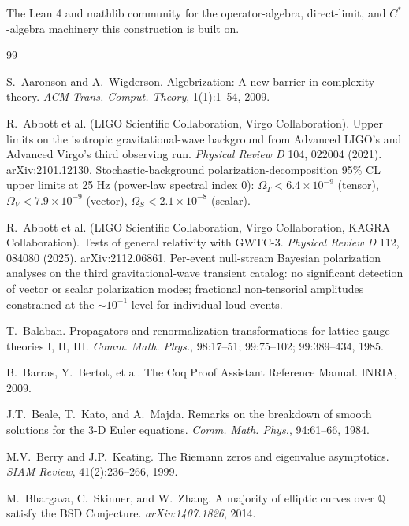 \documentclass[11pt,a4paper]{amsart}
\theoremstyle{plain}
\theoremstyle{definition}
\begin{document}
The Lean 4 and mathlib community for the operator-algebra, direct-limit, and $C^*$-algebra machinery this construction is built on.

\begin{thebibliography}{99}

S.~Aaronson and A.~Wigderson.
\newblock Algebrization: A new barrier in complexity theory.
\newblock \emph{ACM Trans. Comput. Theory}, 1(1):1--54, 2009.

R.~Abbott et al. (LIGO Scientific Collaboration, Virgo Collaboration).
\newblock Upper limits on the isotropic gravitational-wave background from Advanced LIGO's and Advanced Virgo's third observing run.
\newblock \emph{Physical Review D} 104, 022004 (2021). arXiv:2101.12130. Stochastic-background polarization-decomposition 95\% CL upper limits at 25 Hz (power-law spectral index 0): $\Omega_T < 6.4 \times 10^{-9}$ (tensor), $\Omega_V < 7.9 \times 10^{-9}$ (vector), $\Omega_S < 2.1 \times 10^{-8}$ (scalar).

R.~Abbott et al. (LIGO Scientific Collaboration, Virgo Collaboration, KAGRA Collaboration).
\newblock Tests of general relativity with GWTC-3.
\newblock \emph{Physical Review D} 112, 084080 (2025). arXiv:2112.06861. Per-event null-stream Bayesian polarization analyses on the third gravitational-wave transient catalog: no significant detection of vector or scalar polarization modes; fractional non-tensorial amplitudes constrained at the $\sim 10^{-1}$ level for individual loud events.

T.~Balaban.
\newblock Propagators and renormalization transformations for lattice gauge theories I, II, III.
\newblock \emph{Comm. Math. Phys.}, 98:17--51; 99:75--102; 99:389--434, 1985.

B.~Barras, Y.~Bertot, et al.
\newblock The Coq Proof Assistant Reference Manual.
\newblock INRIA, 2009.

J.T.~Beale, T.~Kato, and A.~Majda.
\newblock Remarks on the breakdown of smooth solutions for the 3-D Euler equations.
\newblock \emph{Comm. Math. Phys.}, 94:61--66, 1984.

M.V.~Berry and J.P.~Keating.
\newblock The Riemann zeros and eigenvalue asymptotics.
\newblock \emph{SIAM Review}, 41(2):236--266, 1999.

M.~Bhargava, C.~Skinner, and W.~Zhang.
\newblock A majority of elliptic curves over $\mathbb{Q}$ satisfy the BSD Conjecture.
\newblock \emph{arXiv:1407.1826}, 2014.


\end{thebibliography}
\end{document}
